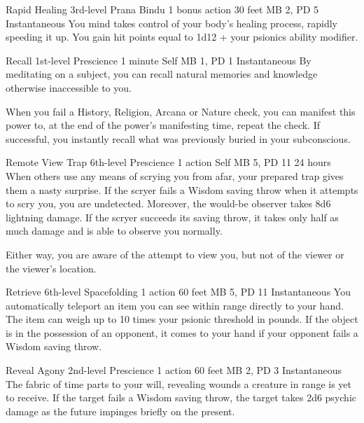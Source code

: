 \DndPowerHeader%
  {Rapid Healing}
  {3rd-level Prana Bindu}
  {1 bonus action}
  {30 feet}
  {MB 2, PD 5}
  {Instantaneous}
You mind takes control of your body's healing process,
rapidly speeding it up.
You gain hit points equal to 1d12 + your psionics ability modifier.

\DndPowerHeader%
  {Recall}
  {1st-level Prescience}
  {1 minute}
  {Self}
  {MB 1, PD 1}
  {Instantaneous}
By meditating on a subject, you can recall
natural memories and knowledge otherwise inaccessible to you.

When you fail a History, Religion, Arcana or Nature check,
you can manifest this power to, at the end of the
power's manifesting time, repeat the check.
If successful, you instantly recall
what was previously buried in your subconscious.

\DndPowerHeader%
  {Remote View Trap}
  {6th-level Prescience}
  {1 action}
  {Self}
  {MB 5, PD 11}
  {24 hours}
  When others use any means of scrying you from afar,
  your prepared trap gives them a nasty surprise.
  If the scryer fails a Wisdom saving throw
  when it attempts to scry you,
  you are undetected.
  Moreover, the would-be observer takes 8d6 lightning damage.
  If the scryer succeeds its saving throw,
  it takes only half as much damage
  and is able to observe you normally.
  
  Either way, you are aware of the attempt to view you,
  but not of the viewer or the viewer's location.

\DndPowerHeader%
  {Retrieve}
  {6th-level Spacefolding}
  {1 action}
  {60 feet}
  {MB 5, PD 11}
  {Instantaneous}
  You automatically teleport an item you can see within range
  directly to your hand.
  The item can weigh up to
  10 times your psionic threshold in pounds.
  If the object is in the possession of an opponent,
  it comes to your hand if your opponent
  fails a Wisdom saving throw.

\DndPowerHeader%
  {Reveal Agony}
  {2nd-level Prescience}
  {1 action}
  {60 feet}
  {MB 2, PD 3}
  {Instantaneous}
  The fabric of time parts to your will,
  revealing wounds a creature in range is yet to receive.
  If the target fails a Wisdom saving throw,
  the target takes 2d6 psychic damage as the future
  impinges briefly on the present.

